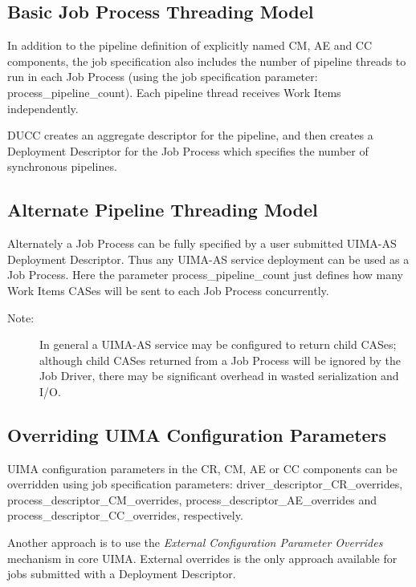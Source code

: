    \subsection{Basic Job Process Threading Model}
   In addition to the pipeline definition of explicitly named CM, AE and CC components, the job
   specification also includes the number of pipeline threads to run in each
   Job Process (using the job specification parameter: process\_pipeline\_count).
   Each pipeline thread receives Work Items independently.

   DUCC creates an aggregate descriptor for the pipeline, and then creates a
   Deployment Descriptor for the Job Process which specifies the number
   of synchronous pipelines.
   
   \subsection{Alternate Pipeline Threading Model}
   Alternately a Job Process can be fully specified by a user submitted UIMA-AS
   Deployment Descriptor. Thus any UIMA-AS service deployment can be used as a
   Job Process. Here the parameter process\_pipeline\_count just defines
   how many Work Items CASes will be sent to each Job Process concurrently.
   
	\begin{description}
	    \item[Note:] In general a UIMA-AS service may be configured to
	    return child CASes; although child CASes returned from a Job Process will be
	    ignored by the Job Driver, there may be significant overhead in wasted
	    serialization and I/O.
	\end{description}

   \subsection{Overriding UIMA Configuration Parameters}
   UIMA configuration parameters in the CR, CM, AE or CC components can be overridden using
   job specification parameters: driver\_descriptor\_CR\_overrides, process\_descriptor\_CM\_overrides,
   process\_descriptor\_AE\_overrides and process\_descriptor\_CC\_overrides, respectively.

   Another approach is to use the {\em External Configuration Parameter Overrides} mechanism
   in core UIMA. External overrides is the only approach available for jobs submitted with
   a Deployment Descriptor.


